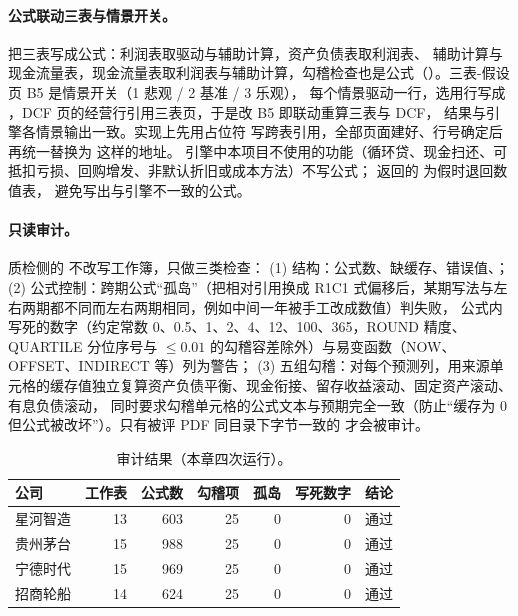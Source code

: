 \paragraph{公式联动三表与情景开关。}  把三表写成公式：利润表取驱动与辅助计算，资产负债表取利润表、
辅助计算与现金流量表，现金流量表取利润表与辅助计算，勾稽检查也是公式（）。三表-假设页 B5 是情景开关（1 悲观 / 2 基准 / 3 乐观），
每个情景驱动一行，选用行写成 ，DCF 页的经营行引用三表页，于是改 B5 即联动重算三表与 DCF，
结果与引擎各情景输出一致。实现上先用占位符  写跨表引用，全部页面建好、行号确定后再统一替换为  这样的地址。
引擎中本项目不使用的功能（循环贷、现金扫还、可抵扣亏损、回购增发、非默认折旧或成本方法）不写公式； 返回的  为假时退回数值表，
避免写出与引擎不一致的公式。

\paragraph{只读审计。} 质检侧的  不改写工作簿，只做三类检查：
(1) 结构：公式数、缺缓存、错误值、；
(2) 公式控制：跨期公式“孤岛”（把相对引用换成 R1C1 式偏移后，某期写法与左右两期都不同而左右两期相同，例如中间一年被手工改成数值）判失败，
公式内写死的数字（约定常数 0、0.5、1、2、4、12、100、365，ROUND 精度、QUARTILE 分位序号与 $\le0.01$ 的勾稽容差除外）与易变函数（NOW、OFFSET、INDIRECT 等）列为警告；
(3) 五组勾稽：对每个预测列，用来源单元格的缓存值独立复算资产负债平衡、现金衔接、留存收益滚动、固定资产滚动、有息负债滚动，
同时要求勾稽单元格的公式文本与预期完全一致（防止“缓存为 0 但公式被改坏”）。只有被评 PDF 同目录下字节一致的  才会被审计。

\begin{table}[t]
\centering
\caption{ 审计结果（本章四次运行）。}
\label{tab:val-audit}
\small
\begin{tabular}{@{}lrrrrrl@{}}
\toprule
公司 & 工作表 & 公式数 & 勾稽项 & 孤岛 & 写死数字 & 结论 \\
\midrule
星河智造 & 13 & 603 & 25 & 0 & 0 & 通过 \\
贵州茅台 & 15 & 988 & 25 & 0 & 0 & 通过 \\
宁德时代 & 15 & 969 & 25 & 0 & 0 & 通过 \\
招商轮船 & 14 & 624 & 25 & 0 & 0 & 通过 \\
\bottomrule
\end{tabular}
\end{table}

